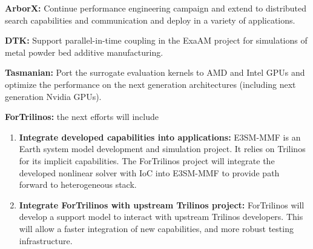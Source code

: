 \indent

{\bf ArborX:} Continue performance engineering campaign and extend to
distributed search capabilities and communication and deploy in a variety of
applications.

{\bf DTK:} Support parallel-in-time coupling in the ExaAM project for
simulations of metal powder bed additive manufacturing.

{\bf Tasmanian:} Port the surrogate evaluation kernels to AMD and Intel
GPUs and optimize the performance on the next generation architectures
(including next generation Nvidia GPUs).

{\bf ForTrilinos:} the next efforts will include
\begin{enumerate}
  \item \textbf{Integrate developed capabilities into applications:} E3SM-MMF
    is an Earth system model development and simulation project. It relies on
    Trilinos for its implicit capabilities. The ForTrilinos project will
    integrate the developed nonlinear solver with IoC into E3SM-MMF to provide
    path forward to heterogeneous stack.
  \item \textbf{Integrate ForTrilinos with upstream Trilinos project:}
    ForTrilinos will develop a support model to interact with upstream Trilinos
    developers. This will allow a faster integration of new capabilities, and
    more robust testing infrastructure.
\end{enumerate}

